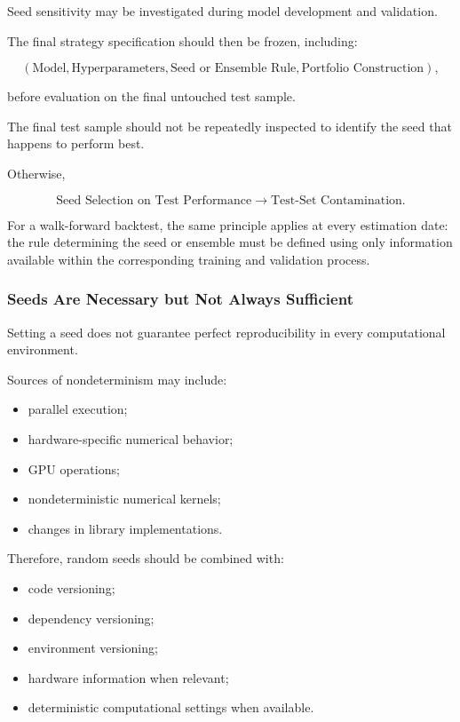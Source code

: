 \documentclass[11pt,a4paper]{article}
\begin{document}
Seed sensitivity may be investigated during model development and validation.

The final strategy specification should then be frozen, including:

\begin{equation}
\boxed{
\left(
\text{Model},
\text{Hyperparameters},
\text{Seed or Ensemble Rule},
\text{Portfolio Construction}
\right),
}
\end{equation}

before evaluation on the final untouched test sample.

The final test sample should not be repeatedly inspected to identify the seed
that happens to perform best.

Otherwise,

\begin{equation}
\boxed{
\text{Seed Selection on Test Performance}
\rightarrow
\text{Test-Set Contamination}.
}
\end{equation}

For a walk-forward backtest, the same principle applies at every estimation
date: the rule determining the seed or ensemble must be defined using only
information available within the corresponding training and validation process.


\subsubsection{Seeds Are Necessary but Not Always Sufficient}

Setting a seed does not guarantee perfect reproducibility in every computational
environment.

Sources of nondeterminism may include:

\begin{itemize}
    \item parallel execution;
    \item hardware-specific numerical behavior;
    \item GPU operations;
    \item nondeterministic numerical kernels;
    \item changes in library implementations.
\end{itemize}

Therefore, random seeds should be combined with:

\begin{itemize}
    \item code versioning;
    \item dependency versioning;
    \item environment versioning;
    \item hardware information when relevant;
    \item deterministic computational settings when available.
\end{itemize}
\end{document}
